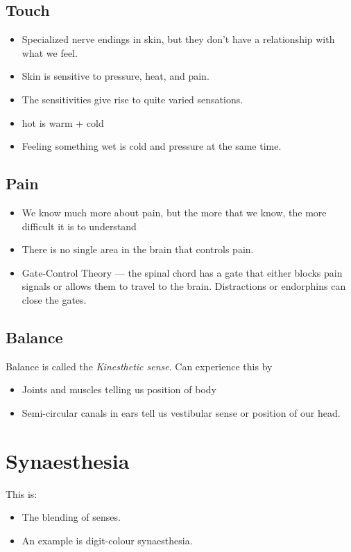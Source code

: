\documentclass[12pt]{article}
\begin{document}
\subsection{Touch}

\begin{itemize}
    \item Specialized nerve endings in skin, but they don't have a 
        relationship with what we feel.
    \item Skin is sensitive to pressure, heat, and pain.
    \item  The sensitivities give rise to quite varied sensations.
    \item hot is warm + cold
    \item Feeling something wet is cold and pressure at the same time.
\end{itemize}

\subsection{Pain}

\begin{itemize}
    \item We know much more about pain, but the more that we know, the more
        difficult it is to understand
    \item There is no single area in the brain that controls pain.
    \item Gate-Control Theory --- the spinal chord has a gate that either
        blocks pain signals or allows them to travel to the brain. Distractions
        or endorphins can close the gates.
\end{itemize}

\subsection{Balance}

Balance is called the \emph{Kinesthetic sense}. Can experience this by
\begin{itemize}
    \item Joints and muscles telling us position of body
    \item Semi-circular canals in ears tell us vestibular sense or position of
        our head.
\end{itemize}

\section{Synaesthesia}

This is:
\begin{itemize}
    \item The blending of senses.
    \item An example is digit-colour synaesthesia.
\end{itemize}
\end{document}

